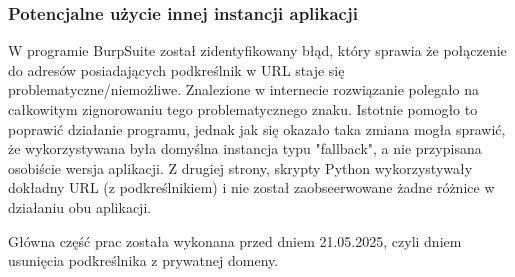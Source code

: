 \documentclass[journal,onecolumn]{IEEEtran}
\begin{document}
\subsubsection{Potencjalne użycie innej instancji aplikacji}
W programie BurpSuite został zidentyfikowany błąd, który sprawia że połączenie do adresów posiadających podkreślnik w URL staje się problematyczne/niemożliwe. Znalezione w internecie rozwiązanie polegało na całkowitym zignorowaniu tego problematycznego znaku. Istotnie pomogło to poprawić działanie programu, jednak jak się okazało taka zmiana mogła sprawić, że wykorzystywana była domyślna instancja typu "fallback", a nie przypisana osobiście wersja aplikacji. Z drugiej strony, skrypty Python wykorzystywały dokładny URL (z podkreślnikiem) i nie został zaobseerwowane żadne różnice w działaniu obu aplikacji.

Główna część prac została wykonana przed dniem 21.05.2025, czyli dniem usunięcia podkreślnika z prywatnej domeny.
\end{document}
